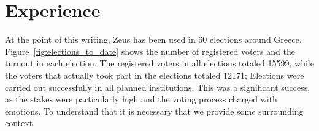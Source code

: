 \documentclass[letterpaper,10pt]{article}
\begin{document}






\section{Experience}
\label{sec:experience}

At the point of this writing, Zeus has been used in 60 elections
around Greece. Figure~\ref{fig:elections_to_date} shows the number of
registered voters and the turnout in each election. The registered
voters in all elections totaled 15599, while the voters that actually
took part in the elections totaled 12171; Elections were carried out
successfully in all planned institutions. This was a significant
success, as the stakes were particularly high and the voting process
charged with emotions. To understand that it is necessary that we
provide some surrounding context.
\end{document}
